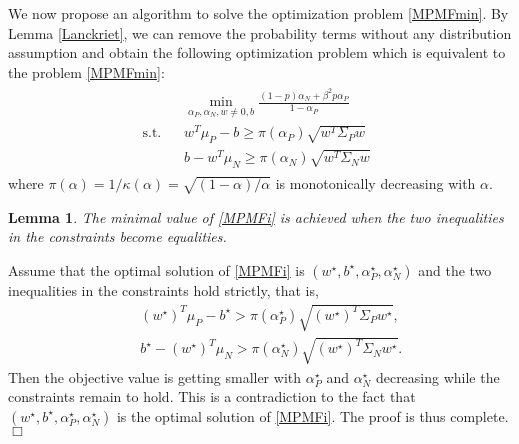 \documentclass[15pt]{article}
\newcommand{\ben}{\begin{eqnarray*}}
\newcommand{\enn}{\end{eqnarray*}}
\newtheorem{lemma}{Lemma}
\newenvironment{proof}{{\em Proof.}}{$\Box$}
\begin{document}
We now propose an algorithm to solve the optimization problem \eqref{MPMFmin}.
By Lemma \ref{Lanckriet}, we can remove the probability terms without any distribution assumption and obtain
the following optimization problem which is equivalent to the problem \eqref{MPMFmin}:
\begin{align}\label{MPMFi}
\begin{split}
&\min_{\alpha_P,\alpha_N,w\neq 0,b}\frac{(1-p)\alpha_N+\beta^2p\alpha_P}{1-\alpha_P}\qquad \\
\text{s.t.}\;\;\; & w^T\mu_P-b\ge\pi(\alpha_P)\sqrt{w^T\Sigma_P w}\\
&b-w^T\mu_N\ge\pi(\alpha_N)\sqrt{w^T\Sigma_N w}
\end{split}
\end{align}
where $\pi(\alpha)={1}/{\kappa(\alpha)}=\sqrt{({1-\alpha})/{\alpha}}$ is monotonically decreasing with $\alpha$.

\begin{lemma}\label{equal}
The minimal value of \eqref{MPMFi} is achieved when the two inequalities in the constraints become equalities.
\end{lemma}

\begin{proof}
Assume that the optimal solution of \eqref{MPMFi} is $(w^\star,b^\star,\alpha_P^\star,\alpha_N^\star)$
and the two inequalities in the constraints hold strictly, that is,
\ben
&&(w^\star)^T\mu_P-b^\star>\pi(\alpha_P^\star)\sqrt{(w^\star)^T\Sigma_P w^\star},\\
&&b^\star-(w^\star)^T\mu_N>\pi(\alpha_N^\star)\sqrt{(w^\star)^T\Sigma_N w^\star}.
\enn
Then the objective value is getting smaller with $\alpha_P^\star$ and $\alpha_N^\star$ decreasing
while the constraints remain to hold. This is a contradiction to the fact that
$(w^\star,b^\star,\alpha_P^\star,\alpha_N^\star)$ is the optimal solution of \eqref{MPMFi}.
The proof is thus complete.
\end{proof}
\end{document}
